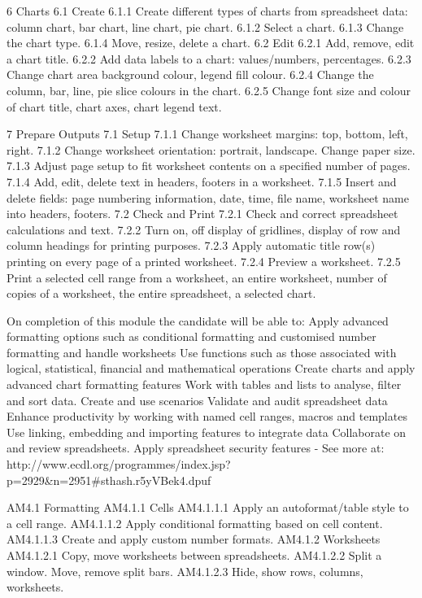 6 Charts 6.1 Create 6.1.1 Create different types of charts 
from spreadsheet data: column 
chart, bar chart, line chart, pie 
chart. 
 6.1.2 Select a chart. 
 6.1.3 Change the chart type. 
 6.1.4 Move, resize, delete a chart. 
6.2 Edit 6.2.1 Add, remove, edit a chart title. 
 6.2.2 Add data labels to a chart: 
values/numbers, percentages. 
 6.2.3 Change chart area background 
colour, legend fill colour. 
 6.2.4 Change the column, bar, line, pie 
slice colours in the chart. 
 6.2.5 Change font size and colour of 
chart title, chart axes, chart 
legend text. 



7 Prepare Outputs 7.1 Setup 7.1.1 Change worksheet margins: top, 
bottom, left, right. 
 7.1.2 Change worksheet orientation: 
portrait, landscape. Change 
paper size. 
 7.1.3 Adjust page setup to fit 
worksheet contents on a 
specified number of pages. 
 7.1.4 Add, edit, delete text in headers, 
footers in a worksheet. 
 7.1.5 Insert and delete fields: page 
numbering information, date, 
time, file name, worksheet name 
into headers, footers. 
 7.2 Check and Print 7.2.1 Check and correct spreadsheet 
calculations and text. 
 7.2.2 Turn on, off display of gridlines, 
display of row and column 
headings for printing purposes. 
 7.2.3 Apply automatic title row(s) 
printing on every page of a 
printed worksheet. 
 7.2.4 Preview a worksheet. 
 7.2.5 Print a selected cell range from a 
worksheet, an entire worksheet, 
number of copies of a worksheet, 
the entire spreadsheet, a 
selected chart. 



On completion of this module the candidate will be able to:
Apply advanced formatting options such as conditional formatting and customised number formatting and handle worksheets
Use functions such as those associated with logical, statistical, financial and mathematical operations
Create charts and apply advanced chart formatting features
Work with tables and lists to analyse, filter and sort data. Create and use scenarios
Validate and audit spreadsheet data
Enhance productivity by working with named cell ranges, macros and templates
Use linking, embedding and importing features to integrate data
Collaborate on and review spreadsheets. Apply spreadsheet security features
- See more at: http://www.ecdl.org/programmes/index.jsp?p=2929&n=2951#sthash.r5yVBek4.dpuf

AM4.1 Formatting AM4.1.1 Cells AM4.1.1.1 Apply an autoformat/table style to a 
cell range. 
 AM4.1.1.2 Apply conditional formatting based on 
cell content. 
 AM4.1.1.3 Create and apply custom number 
formats. 
 AM4.1.2 Worksheets AM4.1.2.1 Copy, move worksheets between 
spreadsheets. 
 AM4.1.2.2 Split a window. Move, remove split 
bars. 
 AM4.1.2.3 Hide, show rows, columns, 
worksheets. 


